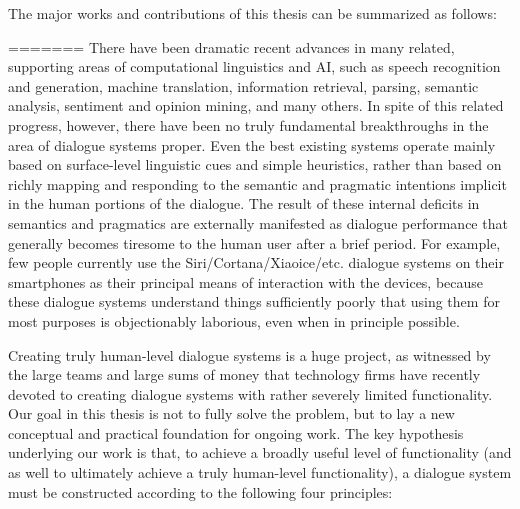 \begin{englishabstract}
The major works and contributions of this thesis can be summarized as follows:

\begin{itemize}

=======
There have been dramatic recent advances in many related, supporting areas of computational linguistics and AI, such as speech recognition and generation, machine translation, information retrieval, parsing, semantic analysis, sentiment and opinion mining, and many others.  In spite of this related progress, however, there have been no truly fundamental breakthroughs in the area of dialogue systems proper.  Even the best existing systems operate mainly based on surface-level linguistic cues and simple heuristics, rather than based on richly mapping and responding to the semantic and pragmatic intentions implicit in the human portions of the dialogue.  The result of these internal deficits in semantics and pragmatics are externally  manifested as dialogue performance that generally becomes tiresome to the human user after a brief period.  For example, few people currently use the Siri/Cortana/Xiaoice/etc. dialogue systems on their smartphones as their principal means of interaction with the devices, because these dialogue systems understand things sufficiently poorly that using them for most purposes is objectionably laborious, even when in principle possible.

Creating truly human-level dialogue systems is a huge project, as witnessed by the large teams and large sums of money that technology firms have recently devoted to creating dialogue systems with rather severely limited functionality.   Our goal in this thesis is not to fully solve the problem, but to lay a new conceptual and practical foundation for ongoing work.  The key hypothesis underlying our work is that, to achieve a broadly useful level of functionality (and as well to ultimately achieve a truly human-level functionality), a dialogue system must be constructed according to the following four principles:


\end{itemize}
\end{englishabstract}
